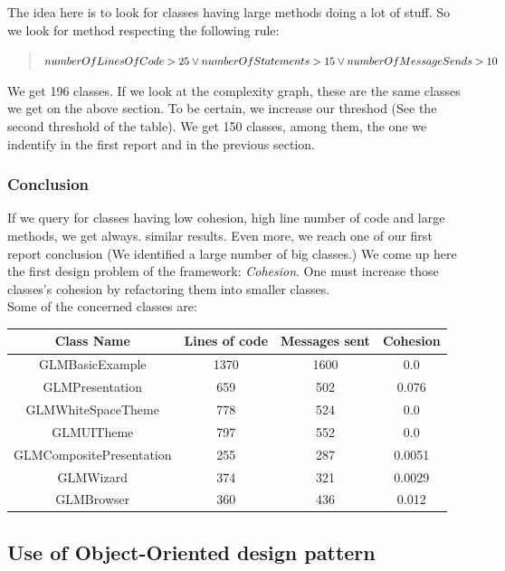 \documentclass[11pt,a4paper]{article}
\begin{document}
The idea here is to look for classes having large methods doing a lot of stuff. So we look for method respecting the following rule:

\begin{quote} $ numberOfLinesOfCode > 25 \\ \vee numberOfStatements > 15 \\ \vee numberOfMessageSends > 10$\\\end{quote}

We get 196 classes. If we look at the complexity graph, these are the same classes we get on the above section. To be certain, we increase our threshod (See the second threshold of the table). We get 150 classes, among them, the one we indentify in the first report and in the previous section. 
\subsubsection{Conclusion}
If we query for classes having low cohesion, high line number of code and large methods, we get always. similar results. Even more, we reach one of our first report conclusion (We identified a large number of big classes.) We come up here the first design problem of the framework: \emph{Cohesion}. One must increase those classes's cohesion by refactoring them into smaller classes.\\

Some of the concerned classes are:\\ 

\begin{tabular}{| c | c | c | c |}
\hline 
Class Name & Lines of code & Messages sent & Cohesion\\
\hline
GLMBasicExample & 1370 & 1600 & 0.0\\
\hline
GLMPresentation & 659 & 502 & 0.076\\
\hline
GLMWhiteSpaceTheme & 778 & 524 & 0.0\\
\hline
GLMUITheme & 797 & 552 & 0.0\\
\hline
GLMCompositePresentation & 255 & 287 & 0.0051\\
\hline 
GLMWizard &  374 & 321 & 0.0029\\
\hline
GLMBrowser & 360 & 436 & 0.012\\
\hline
\end{tabular}
\subsection{Use of Object-Oriented design pattern}
\end{document}
